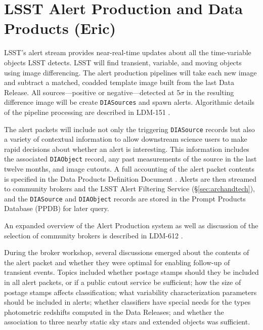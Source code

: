 \section{LSST Alert Production and Data Products (Eric)} \label{sec:alertproduction}

LSST's alert stream provides near-real-time updates about all the time-variable objects LSST detects.
LSST will find transient, variable, and moving objects using image differencing.
The alert production pipelines will take each new image and subtract a matched, coadded template image built from the last Data Release.
All sources---positive or negative---detected at 5$\sigma$ in the resulting difference image will be create \texttt{DIASources} and spawn alerts.  
Algorithmic details of the pipeline processing are described in LDM-151 \citep{LDM-151}.

The alert packets will include not only the triggering \texttt{DIASource} records but also a variety of contextual information to allow downstream science users to make rapid decisions about whether an alert is interesting.
This information includes the associated \texttt{DIAObject} record, any past measurements of the source in the last twelve months, and image cutouts.  
A full accounting of the alert packet contents is specified in the Data Products Definition Document \citep{LSE-163}.
Alerts are then streamed to community brokers and the LSST Alert Filtering Service (\S \ref{sec:archandtech}), and the \texttt{DIASource} and \texttt{DIAObject} records are stored in the Prompt Products Database (PPDB) for later query.

An expanded overview of the Alert Production system as well as discussion of the selection of community brokers is described in  LDM-612 \citep{LDM-612}.

During the broker workshop, several discussions emerged about the contents of the alert packet and whether they were optimal for enabling follow-up of transient events.
Topics included whether postage stamps should they be included in all alert packets, or if a public cutout service be sufficient; how the size of postage stamps affects classification; what variability characterization parameters should be included in alerts; whether classifiers have special needs for the types photometric redshifts computed in the Data Releases; and whether the association to three nearby static sky stars and extended objects was sufficient.

